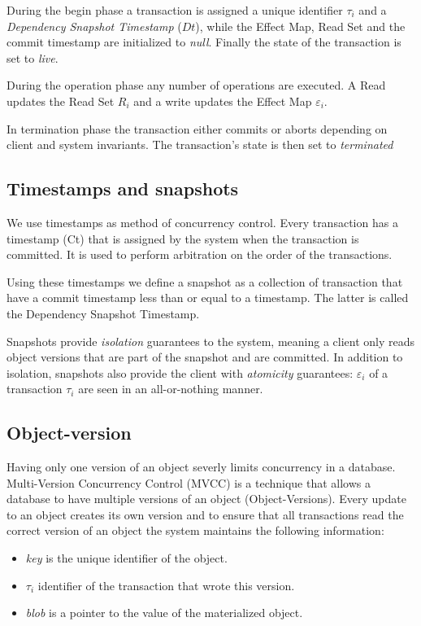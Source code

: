 \documentclass[systeme]{compas2022}
\begin{document}
During the begin phase a transaction is assigned a unique identifier $\tau_i$ and a \emph{Dependency Snapshot Timestamp} ($Dt$), while the Effect Map, Read Set and the commit timestamp are initialized to \emph{null}. Finally the state of the transaction is set to \emph{live}.

During the operation phase any number of operations are executed.
A Read updates the Read Set $R_i$ and a write updates the Effect Map $\varepsilon_i$.

In termination phase the transaction either commits or aborts depending on client and system invariants. 
The transaction's state is then set to \emph{terminated}

\subsection{Timestamps and snapshots}

We use timestamps as method of concurrency control.
Every transaction has a timestamp (Ct) that is assigned by the system when the transaction is committed.
It is used to perform arbitration on the order of the transactions.

Using these timestamps we define a snapshot as a collection of transaction that have a commit timestamp less than or equal to a timestamp.
The latter is called the Dependency Snapshot Timestamp.

Snapshots provide \emph{isolation} guarantees to the system, meaning a client only reads object versions that are part of the snapshot and are committed. 
In addition to isolation, snapshots also provide the client with \emph{atomicity} guarantees: $\varepsilon_i$ of a transaction $\tau_i$ are seen in an all-or-nothing manner.

\subsection{Object-version}

Having only one version of an object severly limits concurrency in a database.
Multi-Version Concurrency Control (MVCC) is a technique that allows a database to have multiple versions of an object (Object-Versions).
Every update to an object creates its own version and to ensure that all transactions read the correct version of an object the system maintains the following information: 
\begin{itemize}
  \item \emph{key} is the unique identifier of the object.
  \item \emph{$\tau_i$} identifier of the transaction that wrote this version.
  \item \emph{blob} is a pointer to the value of the materialized object.
\end{itemize}
\end{document}
